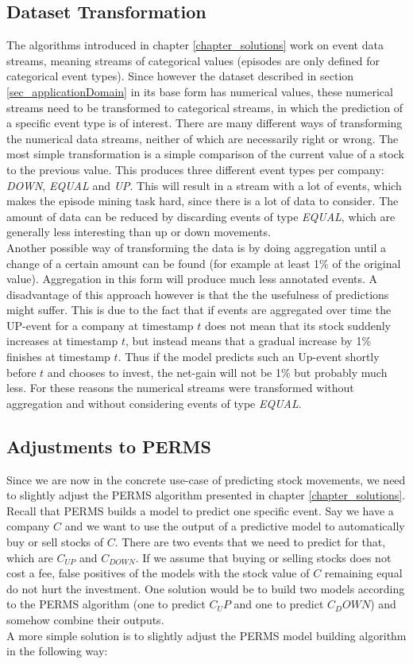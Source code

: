 \subsection{Dataset Transformation}
\label{subsec_transformation}
The algorithms introduced in chapter \ref{chapter_solutions} work on event data streams, meaning streams of categorical values (episodes are only defined for categorical event types). Since however the dataset described in section \ref{sec_applicationDomain} in its base form has numerical values, these numerical streams need to be transformed to categorical streams, in which the prediction of a specific event type is of interest. There are many different ways of transforming the numerical data streams, neither of which are necessarily right or wrong. The most simple transformation is a simple comparison of the current value of a stock to the previous value. This produces three different event types per company: \textit{DOWN}, \textit{EQUAL} and \textit{UP}. This will result in a stream with a lot of events, which makes the episode mining task hard, since there is a lot of data to consider. The amount of data can be reduced by discarding events of type \textit{EQUAL}, which are generally less interesting than up or down movements. \\
Another possible way of transforming the data is by doing aggregation until a change of a certain amount can be found (for example at least 1\% of the original value). Aggregation in this form will produce much less annotated events. A disadvantage of this approach however is that the the usefulness of predictions might suffer. This is due to the fact that if events are aggregated over time the UP-event for a company at timestamp $t$ does not mean that its stock suddenly increases at timestamp $t$, but instead means that a gradual increase by 1\% finishes at timestamp $t$. Thus if the model predicts such an Up-event shortly before $t$ and chooses to invest, the net-gain will not be 1\% but probably much less. For these reasons the numerical streams were transformed without aggregation and without considering events of type \textit{EQUAL}.

\subsection{Adjustments to PERMS}
Since we are now in the concrete use-case of predicting stock movements, we need to slightly adjust the PERMS algorithm presented in chapter \ref{chapter_solutions}. Recall that PERMS builds a model to predict one specific event. Say we have a company $C$ and we want to use the output of a predictive model to automatically buy or sell stocks of $C$. There are two events that we need to predict for that, which are $C_{UP}$ and $C_{DOWN}$. If we assume that buying or selling stocks does not cost a fee, false positives of the models with the stock value of $C$ remaining equal do not hurt the investment. One solution would be to build two models according to the PERMS algorithm (one to predict $C_UP$ and one to predict $C_DOWN$) and somehow combine their outputs. \\ A more simple solution is to slightly adjust the PERMS model building algorithm in the following way:

